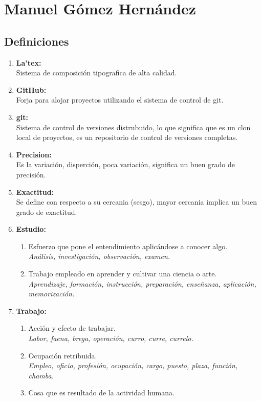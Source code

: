 \section{Manuel Gómez Hernández}
\subsection{Definiciones}

\begin{enumerate}
     
\item \textbf{La'tex: }
     \\Sistema de composición tipografica de alta calidad.

\item \textbf{GitHub: }
    \\Forja para alojar proyectos utilizando el sistema de control de git.

\item \textbf{git: }
    \\Sistema de control de versiones distrubuido, lo que significa que es un clon local de proyectos, es un repositorio de control de versiones completas.

\item \textbf{Precision: }
    \\Es la variación, disperción, poca variación, significa un buen grado de precisión.

\item \textbf{Exactitud: }
    \\Se define con respecto a su cercania (sesgo), mayor cercania implica un buen grado de exactitud.

\item \textbf{Estudio: } 
\begin{enumerate}
\item Esfuerzo que pone el entendimiento aplicándose a conocer algo.
\\ \textit{Análisis, investigación, observación, examen.}
\item Trabajo empleado en aprender y cultivar una ciencia o arte.
\\ \textit{Aprendizaje, formación, instrucción, preparación, enseñanza, aplicación, memorización.}
\cite{RAE}
\end{enumerate}

\item \textbf{Trabajo: }
\begin{enumerate}
    \item Acción y efecto de trabajar.
    \\ \textit{Labor, faena, brega, operación, curro, curre, currelo.}
    \item Ocupación retribuida.
    \\ \textit{Empleo, oficio, profesión, ocupación, cargo, puesto, plaza, función, chamba.}
    \item Cosa que es resultado de la actividad humana.
    \\ \cite{RAE}
\end{enumerate}


\end{enumerate}
